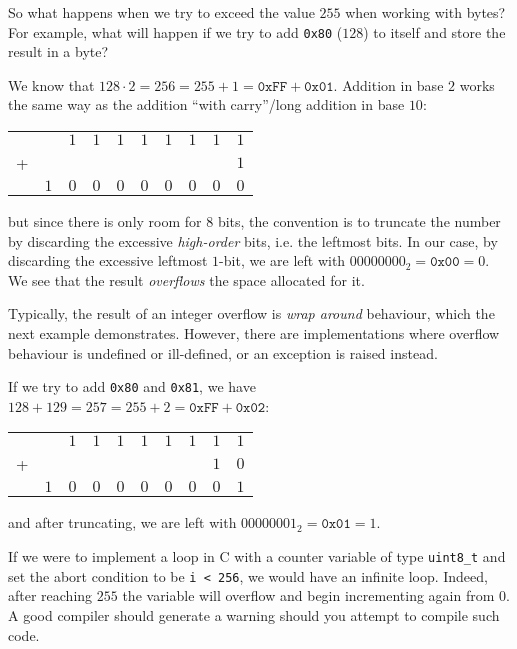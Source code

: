 \documentclass[parskip=half]{scrartcl}
\begin{document}
So what happens when we try to exceed the value $255$ when working with bytes?
For example, what will happen if we try to add \texttt{0x80} ($128$) to itself and store the result in a byte?

We know that $128 \cdot 2 = 256 = 255 + 1 = \texttt{0xFF} + \texttt{0x01}$.
Addition in base $2$ works the same way as the addition \enquote{with carry}/long addition in base $10$:
\begin{center}
  \begin{tabular}{cccccccccc}
    & & $1$ & $1$ & $1$ & $1$ & $1$ & $1$ & $1$ & $1$\\
  + & & & & & & & & & $1$\\
  \hline
    & $1$ & $0$ & $0$ & $0$ & $0$ & $0$ & $0$ & $0$ & $0$\\
  \end{tabular}
\end{center}
but since there is only room for $8$ bits, the convention is to truncate the number by discarding the excessive \emph{high-order} bits, i.e. the leftmost bits.
In our case, by discarding the excessive leftmost $1$-bit, we are left with $00000000_2=\texttt{0x00} = 0$.
We see that the result \emph{overflows} the space allocated for it.

Typically, the result of an integer overflow is \emph{wrap around} behaviour, which the next example demonstrates.
However, there are implementations where overflow behaviour is undefined or ill-defined, or an exception is raised instead.

If we try to add \texttt{0x80} and \texttt{0x81}, we have
$128 + 129 = 257 = 255 + 2 = \texttt{0xFF} + \texttt{0x02}$:
\begin{center}
  \begin{tabular}{cccccccccc}
    & & $1$ & $1$ & $1$ & $1$ & $1$ & $1$ & $1$ & $1$\\
  + & & & & & & & & $1$ & $0$\\
  \hline
    & $1$ & $0$ & $0$ & $0$ & $0$ & $0$ & $0$ & $0$ & $1$\\
  \end{tabular}
\end{center}
and after truncating, we are left with $00000001_2 = \texttt{0x01} = 1$.

If we were to implement a loop in C with a counter variable of type \texttt{uint8\_t} and set the abort condition to be \texttt{i < 256}, we would have an infinite loop.
Indeed, after reaching $255$ the variable will overflow and begin incrementing again from $0$.
A good compiler should generate a warning should you attempt to compile such code.
\end{document}
